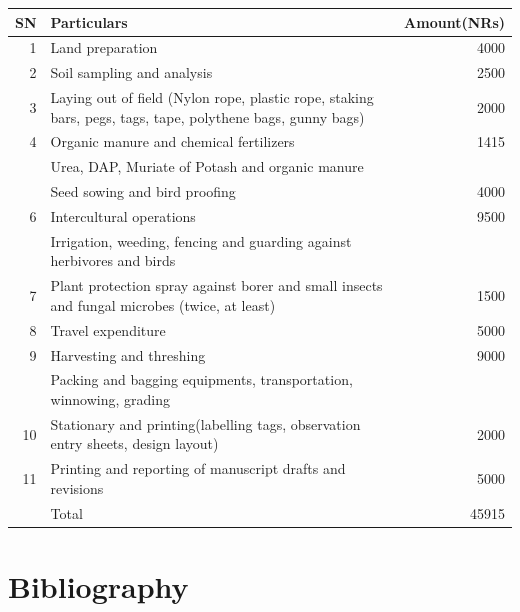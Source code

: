 \documentclass[
]{article}
\begin{document}
\begin{longtable}{r>{\raggedright\arraybackslash}p{24em}r}
\toprule
SN & Particulars & Amount(NRs)\\
\midrule
\rowcolor{gray!6}  1 & Land preparation & 4000\\
2 & Soil sampling and analysis & 2500\\
\rowcolor{gray!6}  3 & Laying out of field (Nylon rope, plastic rope, staking bars, pegs, tags, tape, polythene bags, gunny bags) & 2000\\
4 & Organic manure and chemical fertilizers & 1415\\
\rowcolor{gray!6}   & Urea, DAP, Muriate of Potash and organic manure & \\
\addlinespace
5 & Seed sowing and bird proofing & 4000\\
\rowcolor{gray!6}  6 & Intercultural operations & 9500\\
 & Irrigation, weeding, fencing and guarding against herbivores and birds & \\
\rowcolor{gray!6}  7 & Plant protection spray against borer and small insects and fungal microbes (twice, at least) & 1500\\
8 & Travel expenditure & 5000\\
\addlinespace
\rowcolor{gray!6}  9 & Harvesting and threshing & 9000\\
 & Packing and bagging equipments, transportation, winnowing, grading & \\
\rowcolor{gray!6}  10 & Stationary and printing(labelling tags, observation entry sheets, design layout) & 2000\\
11 & Printing and reporting of manuscript drafts and revisions & 5000\\
\rowcolor{gray!6}   & Total & 45915\\
\bottomrule
\end{longtable}

\hypertarget{bibliography}{%
\section*{Bibliography}\label{bibliography}}
\end{document}
